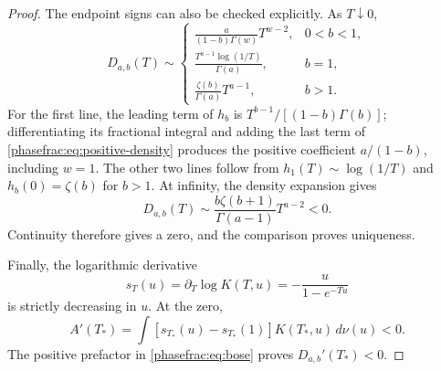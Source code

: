 \begin{proof}
The endpoint signs can also be checked explicitly. As $T\downarrow0$,
\[
 D_{a,b}(T)\sim
 \begin{cases}
 \displaystyle\frac{a}{(1-b)\Gamma(w)}T^{w-2},&0<b<1,\\[5pt]
 \displaystyle\frac{T^{a-1}\log(1/T)}{\Gamma(a)},&b=1,\\[5pt]
 \displaystyle\frac{\zeta(b)}{\Gamma(a)}T^{a-1},&b>1.
 \end{cases}
\]
For the first line, the leading term of $h_b$ is
$T^{b-1}/[(1-b)\Gamma(b)]$; differentiating its fractional integral
and adding the last term of \eqref{phasefrac:eq:positive-density}
produces the positive coefficient $a/(1-b)$, including $w=1$.
The other two lines follow from $h_1(T)\sim\log(1/T)$ and
$h_b(0)=\zeta(b)$ for $b>1$.
At infinity, the density expansion gives
\[
 D_{a,b}(T)\sim\frac{b\zeta(b+1)}{\Gamma(a-1)}T^{a-2}<0.
\]
Continuity therefore gives a zero, and the comparison proves uniqueness.

Finally, the logarithmic derivative
\[
 s_T(u)=\partial_T\log K(T,u)=-\frac{u}{1-e^{-Tu}}
\]
is strictly decreasing in $u$. At the zero,
\[
 A'(T_*)=\int[s_{T_*}(u)-s_{T_*}(1)]K(T_*,u)\,d\nu(u)<0.
\]
The positive prefactor in \eqref{phasefrac:eq:bose} proves
$D_{a,b}'(T_*)<0$.
\end{proof}

